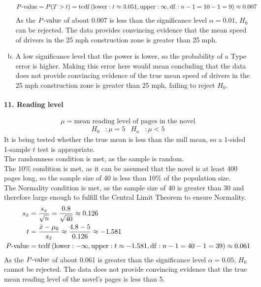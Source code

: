 \documentclass[../Homework]{subfiles}
\begin{document}
\begin{enumerate}[a.]
\begin{align*}
						P\text{-value} &= P(T > t) = \operatorname{tcdf}\left(\operatorname{lower}: t \approx 3.051, \operatorname{upper}: \infty, \operatorname{df}: n - 1 = 10 - 1 = 9\right) \approx 0.007
					\end{align*}
					As the $P\text{-value}$ of about $0.007$ is less than the significance level $\alpha = 0.01$, $H_0$ can be rejected. The data provides convincing evidence that the mean speed of drivers in the 25 mph construction zone is greater than 25 mph.
				\item
					A low significance level that the power is lower, so the probability of a Type  error is higher. Making this error here would mean concluding that the data does not provide convincing evidence of the true mean speed of drivers in the 25 mph construction zone is greater than 25 mph, failing to reject $H_0$.
			\end{enumerate}
		\paragraph{11. Reading level}
			\[\mu = \text{mean reading level of pages in the novel}\]
			\begin{align*}
				H_0&: \mu = 5 & H_a&: \mu < 5
			\end{align*}
			It is being tested whether the true mean is less than the null mean, so a 1-sided 1-sample $t$ test is appropriate. \\
			The randomness condition is met, as the sample is random. \\
			The 10\% condition is met, as it can be assumed that the novel is at least 400 pages long, so the sample size of 40 is less than 10\% of the population size. \\
			The Normality condition is met, as the sample size of 40 is greater than 30 and therefore large enough to fulfill the Central Limit Theorem to ensure Normality.
			\begin{align*}
				s_{\bar{x}} &= \frac{s_x}{\sqrt{n}} = \frac{0.8}{\sqrt{40}} \approx 0.126 \\
				t &= \frac{\bar{x} - \mu_0}{s_{\bar{x}}} \approx \frac{4.8 - 5}{0.126} \approx -1.581 \\
				P\text{-value} &= \operatorname{tcdf}\left(\operatorname{lower}: -\infty, \operatorname{upper}: t \approx -1.581, \operatorname{df}: n - 1 = 40 - 1 = 39\right) \approx 0.061
			\end{align*}
			As the $P\text{-value}$ of about 0.061 is greater than the significance level $\alpha = 0.05$, $H_0$ cannot be rejected. The data does not provide convincing evidence that the true mean reading level of the novel's pages is less than 5.
\end{document}
